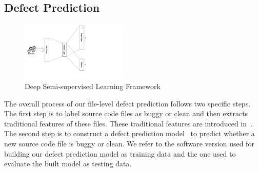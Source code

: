 \subsection{Defect Prediction}
\label{sec:defect_prediction}
\begin{figure}
	\centering
	\includegraphics[width=0.45\textwidth]{dssl_framework}
	\caption{Deep Semi-supervised Learning Framework}
	\label{fig:semi_framework}
\end{figure}


The overall process of our file-level defect prediction follows two specific steps. The first step is to label source code files as buggy or clean and then extracts traditional features of these files. These traditional features are introduced in~\cite{wang2016automatically, mccabe1976complexity, chakradeo2013mast}. The second step is to construct a defect prediction model~\cite{bishop2006pattern} to predict whether a new source code file is buggy or clean.  We refer to the software version used for building our defect prediction model as training data and the one used to evaluate the built model as testing data. 


